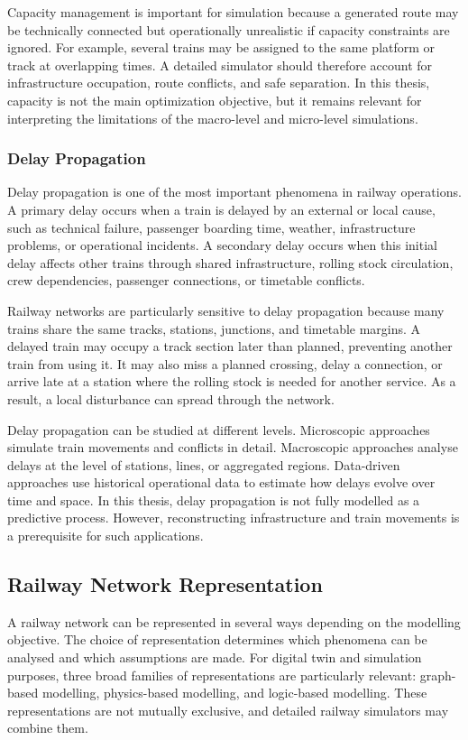 Capacity management is important for simulation because a generated route may be technically connected but operationally 
unrealistic if capacity constraints are ignored. For example, several trains may be assigned to the same platform or track 
at overlapping times. A detailed simulator should therefore account for infrastructure occupation, route conflicts, and 
safe separation. In this thesis, capacity is not the main optimization objective, but it remains relevant for interpreting 
the limitations of the macro-level and micro-level simulations.

\subsubsection{Delay Propagation}
Delay propagation is one of the most important phenomena in railway operations. A primary delay occurs when a train is 
delayed by an external or local cause, such as technical failure, passenger boarding time, weather, infrastructure 
problems, or operational incidents. A secondary delay occurs when this initial delay affects other trains through shared 
infrastructure, rolling stock circulation, crew dependencies, passenger connections, or timetable 
conflicts\cite{ghofrani2018progression, dekker2022delay}.

Railway networks are particularly sensitive to delay propagation because many trains share the same tracks, stations, 
junctions, and timetable margins. A delayed train may occupy a track section later than planned, preventing another train 
from using it. It may also miss a planned crossing, delay a connection, or arrive late at a station where the rolling 
stock is needed for another service. As a result, a local disturbance can spread through the network.

Delay propagation can be studied at different levels. Microscopic approaches simulate train movements and conflicts in 
detail. Macroscopic approaches analyse delays at the level of stations, lines, or aggregated regions. Data-driven 
approaches use historical operational data to estimate how delays evolve over time and space. In this thesis, delay 
propagation is not fully modelled as a predictive process. However, reconstructing infrastructure and train movements is a 
prerequisite for such applications.

\subsection{Railway Network Representation}
A railway network can be represented in several ways depending on the modelling objective. The choice of representation 
determines which phenomena can be analysed and which assumptions are made. For digital twin and simulation purposes, three 
broad families of representations are particularly relevant: graph-based modelling, physics-based modelling, and 
logic-based modelling. These representations are not mutually exclusive, and detailed railway simulators may combine them.

